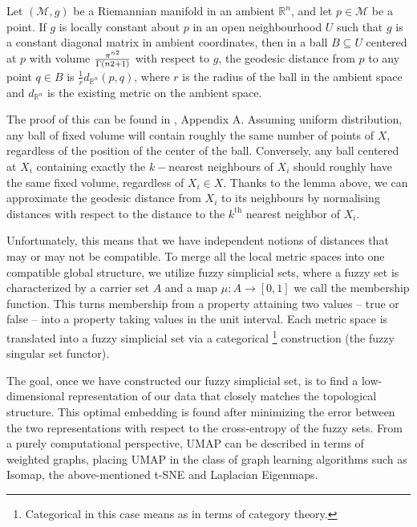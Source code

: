 \begin{lemma}
  Let $(\mathcal{M}, g)$ be a Riemannian manifold in an ambient $\mathbb{R}^{n}$, and let $p \in \mathcal{M}$ be a point. If $g$ is locally constant about $p$ in an open neighbourhood $U$ such that $g$ is a constant diagonal matrix in ambient coordinates, then in a ball $B \subseteq U$ centered at $p$ with volume $\frac{\pi^{n\/2}}{\Gamma(n\/2 + 1)}$ with respect to $g$, the geodesic distance from $p$ to any point $q \in B$ is $\frac{1}{r}d_{\mathbb{R}^{n}}(p,q)$, where $r$ is the radius of the ball in the ambient space and $d_{\mathbb{R}^{n}}$ is the existing metric on the ambient space.
\end{lemma}

The proof of this can be found in \cite{mcinnes2020umapuniformmanifoldapproximation}, Appendix A. Assuming uniform distribution, any ball of fixed volume will contain roughly the same number of points of $X$, regardless of the position of the center of the ball. Conversely, any ball centered at $X_{i}$ containing exactly the $k-$nearest neighbours of $X_{i}$ should roughly have the same fixed volume, regardless of $X_{i} \in X$. Thanks to the lemma above, we can approximate the geodesic distance from $X_{i}$ to its neighbours by normalising distances with respect to the distance to the $k^{\text{th}}$ nearest neighbor of $X_{i}$.

Unfortunately, this means that we have independent notions of distances that may or may not be compatible. To merge all the local metric spaces into one compatible global structure, we utilize fuzzy simplicial sets, where a fuzzy set is characterized by a carrier set $A$ and a map $\mu: A \to [0,1]$ we call the membership function. This turns membership from a property attaining two values -- true or false -- into a property taking values in the unit interval. Each metric space is translated into a fuzzy simplicial set via a categorical \footnote{Categorical in this case means as in terms of category theory.} construction (the fuzzy singular set functor).

The goal, once we have constructed our fuzzy simplicial set, is to find a low-dimensional representation of our data that closely matches the topological structure. This optimal embedding is found after minimizing the error between the two representations with respect to the cross-entropy of the fuzzy sets. From a purely computational perspective, UMAP can be described in terms of weighted graphs, placing UMAP in the class of graph learning algorithms such as Isomap, the above-mentioned t-SNE and Laplacian Eigenmaps.

